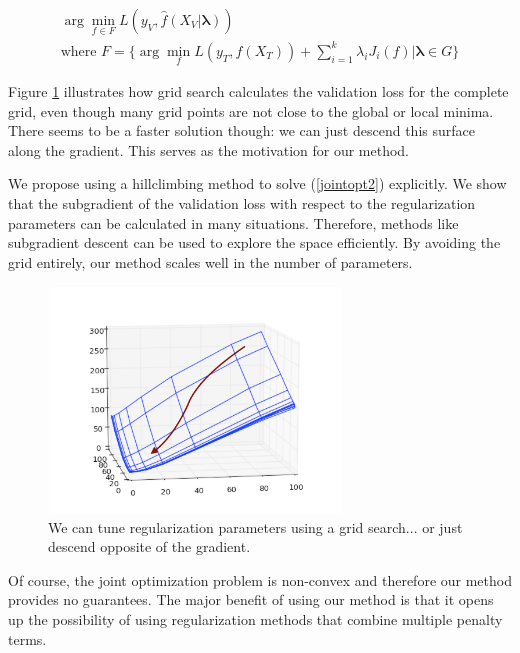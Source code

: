\documentclass[10pt,letterpaper]{article}
\begin{document}
\begin{equation}
\begin{array}{c}
\arg \min_{f \in F} L(y_V, \hat f (X_V | \boldsymbol{\lambda})) \\
\text{where } F = \{ \arg \min_f L(y_T, f (X_T)) + \sum\limits_{i=1}^k \lambda_i J_i(f) | \boldsymbol{\lambda} \in G\}
\end{array}
\end{equation}

Figure \ref{fig:compare} illustrates how grid search calculates the validation loss for the complete grid, even though many grid points are not close to the global or local minima. There seems to be a faster solution though: we can just descend this surface along the gradient. This serves as the motivation for our method.

We propose using a hillclimbing method to solve (\ref{jointopt2}) explicitly. We show that the subgradient of the validation loss with respect to the regularization parameters can be calculated in many situations. Therefore, methods like subgradient descent can be used to explore the space efficiently. By avoiding the grid entirely, our method scales well in the number of parameters.

\begin{figure}
\begin{center}
\includegraphics[height=60mm]{surface_in_regularization_parameters.png}
\end{center}
\caption{We can tune regularization parameters using a grid search... or just descend opposite of the gradient.}
\label{fig:compare}
\end{figure}

Of course, the joint optimization problem is non-convex and therefore our method provides no guarantees. The major benefit of using our method is that it opens up the possibility of using regularization methods that combine multiple penalty terms.
\end{document}
